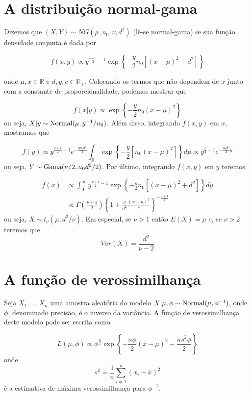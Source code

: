 \documentclass[
  letterpaper,
  DIV=11,
  numbers=noendperiod]{scrreprt}
\theoremstyle{plain}
\theoremstyle{definition}
\theoremstyle{definition}
\theoremstyle{remark}
\begin{document}
\section{A distribuição
normal-gama}\label{a-distribuiuxe7uxe3o-normal-gama}

Dizemos que \((X,Y)\sim NG(\mu,n_0,\nu,d^2)\) (lê-se normal-gama) se sua
função densidade conjunta é dada por

\[f(x,y)\propto y^{\frac{\nu+1}{2}-1}\exp\left\{-\frac{y}{2}n_0\left[(x-\mu)^2 + d^2\right]\right\}\]

onde \(\mu,x\in\mathbb{R}\) e \(d,y,c\in\mathbb{R}_+\). Colocando os
termos que não dependem de \(x\) junto com a constante de
proporcionalidade, podemos mostrar que

\[f(x|y)\propto \exp\left\{-\frac{y}{2}n_0(x-\mu)^2\right\}\] ou seja,
\(X|y\sim\hbox{Normal}(\mu,y^{-1}/n_0)\). Além disso, integrando
\(f(x,y)\) em \(x\), mostramos que

\[f(y)\propto y^{\frac{\nu+1}{2}-1}e^{-\frac{yn_0d^2}{2}}\int_{\mathbb{R}}\exp\left\{-\frac{y}{2}\left[n_0(x-\mu)^2\right]\right\}d\mu\propto y^{\frac{\nu}{2}-1}e^{-\frac{n_0d^2}{2}y}\]
ou seja, \(Y\sim\hbox{Gama}(\nu/2, n_0d^2/2)\). Por último, integrando
\(f(x,y)\) em \(y\) teremos

\[\begin{align}f(x)&\propto \int_0^\infty y^{\frac{\nu+1}{2}-1}\exp\left\{-\frac{y}{2}n_0\left[(x-\mu)^2 + d^2\right]\right\}dy \\&\propto \Gamma\left(\frac{\nu+1}{2}\right)\left\{1+\frac{\nu}{d^2}\frac{(x-\mu)^2}{\nu}\right\}^{-\frac{\nu+1}{2}}\end{align}\]
ou seja, \(X\sim t_{\nu}(\mu, d^2/\nu)\). Em especial, se \(\nu>1\)
então \(E(X)=\mu\) e, se \(\nu>2\) teremos que
\[Var(X)=\frac{d^2}{\nu-2}\]

\section{A função de
verossimilhança}\label{a-funuxe7uxe3o-de-verossimilhanuxe7a-1}

Seja \(X_1,\ldots,X_n\) uma amostra aleatória do modelo
\(X|\mu,\phi\sim\hbox{Normal}(\mu,\phi^{-1})\), onde \(\phi\),
denominado precisão, é o inverso da variância. A função de
verossimilhança deste modelo pode ser escrita como

\[L(\mu,\phi)\propto \phi^{\frac{n}{2}}\exp\left\{-\frac{n\phi}{2}(\bar{x}-\mu)^2 -\frac{ns^2\phi}{2}\right\}\]
onde \[s^2=\frac{1}{n}\sum_{i=1}^n(x_i-\bar{x})^2\] é a estimativa de
máxima verossimilhança para \(\phi^{-1}\).
\end{document}
